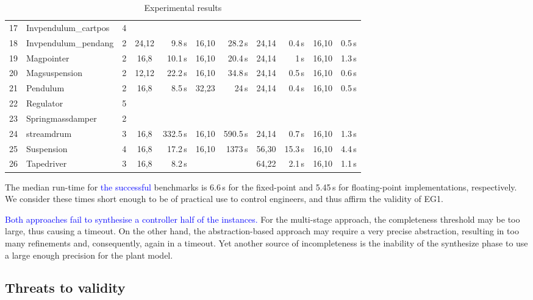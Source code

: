 \documentclass[twocolumn]{autart}    %
\newcommand{\xmark}{\ding{55}}
\begin{document}
\begin{table}
\begin{tabular}{| r | l | c | c | r | c | r | c | r | c | r |}
17 & Invpendulum\_cartpos & 4 & & ~\xmark & & ~\xmark & & ~\xmark & & ~\xmark\\
18 & Invpendulum\_pendang & 2 & 24,12 & 9.8\,s & 16,10 & 28.2\,s & 24,14 & 0.4\,s & 16,10 & 0.5\,s\\
19 & Magpointer   & 2 & 16,8 & 10.1\,s & 16,10 & 20.4\,s & 24,14  & 1\,s& 16,10 & 1.3\,s\\
20 & Magsuspension  & 2 & 12,12  & 22.2\,s  & 16,10 & 34.8\,s & 24,14 & 0.5\,s & 16,10 & 0.6\,s\\
21 & Pendulum   & 2 & 16,8 & 8.5\,s & 32,23 & 24\,s & 24,14 & 0.4\,s & 16,10 & 0.5\,s\\
22 & Regulator   & 5 & & ~\xmark & & ~\xmark & & ~\xmark & & ~\xmark\\
23 & Springmassdamper & 2 & & ~\xmark & & ~\xmark & & ~\xmark & & ~\xmark\\
24 & streamdrum   & 3 & 16,8  & 332.5\,s & 16,10 & 590.5\,s & 24,14 & 0.7\,s & 16,10 &1.3\,s\\
25 & Suspension  & 4 & 16,8  & 17.2\,s & 16,10 &1373\,s & 56,30 & 15.3\,s & 16,10 & 4.4\,s\\
26 & Tapedriver   & 3 & 16,8  & 8.2\,s & & ~\xmark & 64,22 & 2.1\,s & 16,10 & 1.1\,s\\
\hline
%
\end{tabular}
\vspace{0.05in}
\caption{Experimental results\label{tab:results}}
\end{table}

The median run-time for \textcolor{blue}{the successful} benchmarks is 6.6\,s for the fixed-point and 5.45\,s for floating-point implementations, respectively.  
We consider these times short enough to be of practical use to control engineers, and thus affirm the validity of EG1.

\textcolor{blue}{Both approaches fail to synthesise a controller half of the instances.}  
For the multi-stage approach, the completeness threshold may be too large, thus causing a timeout.  
On the other hand, the abstraction-based approach may require a very precise abstraction, resulting in too many refinements and, consequently, again in a timeout.  
Yet another source of incompleteness is the inability of the {\sc synthesize} phase to use a large enough precision for
the plant model.

\subsection{Threats to validity}
\label{exp:threats-to-validity}
\end{document}
